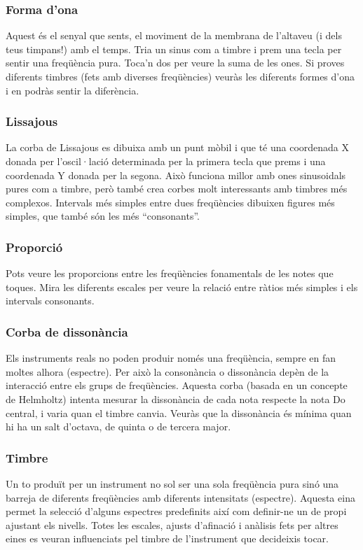 \subsubsection{Forma d'ona}
Aquest és el senyal que sents, el moviment de la membrana de l'altaveu (i dels teus timpans!) amb el temps. Tria un sinus com a timbre i prem una tecla per sentir una freqüència pura. Toca'n dos per veure la suma de les ones. Si proves diferents timbres (fets amb diverses freqüències) veuràs les diferents formes d'ona i en podràs sentir la diferència.

\subsubsection{Lissajous}
La corba de Lissajous es dibuixa amb un punt mòbil i que té una coordenada X donada per l'oscil·lació determinada per la primera tecla que prems i una coordenada Y donada per la segona. Això funciona millor amb ones sinusoidals pures com a timbre, però també crea corbes molt interessants amb timbres més complexos. Intervals més simples entre dues freqüències dibuixen figures més simples, que també són les més ``consonants''.

\subsubsection{Proporció}
Pots veure les proporcions entre les freqüències fonamentals de les notes que toques. Mira les diferents escales per veure la relació entre ràtios més simples i els intervals consonants.

\subsubsection{Corba de dissonància}
Els instruments reals no poden produir només una freqüència, sempre en fan moltes alhora (espectre). Per això la consonància o dissonància depèn de la interacció entre els grups de freqüències. Aquesta corba (basada en un concepte de Helmholtz) intenta mesurar la dissonància de cada nota respecte la nota Do central, i varia quan el timbre canvia. Veuràs que la dissonància és mínima quan hi ha un salt d'octava, de quinta o de tercera major.

\subsubsection{Timbre}
Un to produït per un instrument no sol ser una sola freqüència pura sinó una barreja de diferents freqüències amb diferents intensitats (espectre). Aquesta eina permet la selecció d'alguns espectres predefinits així com definir-ne un de propi ajustant els nivells. Totes les escales, ajusts d'afinació i anàlisis fets per altres eines es veuran influenciats pel timbre de l'instrument que decideixis tocar.

